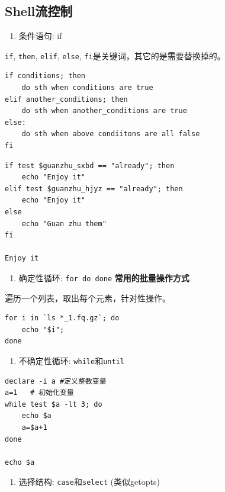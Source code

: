 \documentclass[]{article}
\providecommand{\tightlist}{%
  \setlength{\itemsep}{0pt}\setlength{\parskip}{0pt}}
\numberwithin{figure}{section}
\numberwithin{table}{section}
\begin{document}
\hypertarget{bash_flow}{%
\subsection{Shell流控制}\label{bash_flow}}

\begin{enumerate}
\def\labelenumi{\arabic{enumi}.}
\tightlist
\item
  条件语句: if
\end{enumerate}

\texttt{if}, \texttt{then}, \texttt{elif}, \texttt{else}, \texttt{fi}是关键词，其它的是需要替换掉的。

\begin{verbatim}
if conditions; then
	do sth when conditions are true
elif another_conditions; then
	do sth when another_conditions are true
else:
	do sth when above condiitons are all false
fi
\end{verbatim}

\begin{verbatim}
if test $guanzhu_sxbd == "already"; then
	echo "Enjoy it"
elif test $guanzhu_hjyz == "already"; then
	echo "Enjoy it"
else
	echo "Guan zhu them"
fi

Enjoy it
\end{verbatim}

\begin{enumerate}
\def\labelenumi{\arabic{enumi}.}
\setcounter{enumi}{1}
\tightlist
\item
  确定性循环: \texttt{for\ do\ done} \textbf{常用的批量操作方式}
\end{enumerate}

遍历一个列表，取出每个元素，针对性操作。

\begin{verbatim}
for i in `ls *_1.fq.gz`; do 
	echo "$i"; 
done
\end{verbatim}

\begin{enumerate}
\def\labelenumi{\arabic{enumi}.}
\setcounter{enumi}{2}
\tightlist
\item
  不确定性循环: \texttt{while}和\texttt{until}
\end{enumerate}

\begin{verbatim}
declare -i a #定义整数变量
a=1   # 初始化变量
while test $a -lt 3; do
	echo $a
	a=$a+1
done 

echo $a
\end{verbatim}

\begin{enumerate}
\def\labelenumi{\arabic{enumi}.}
\setcounter{enumi}{3}
\tightlist
\item
  选择结构: \texttt{case}和\texttt{select} (类似getopts)
\end{enumerate}
\end{document}
